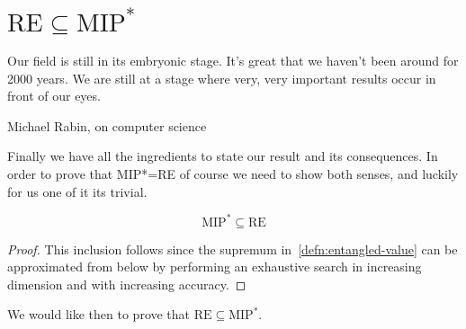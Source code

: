 \section{$\text{RE} \subseteq \text{MIP}^*$}
\epigraph{Our field is still in its embryonic stage. It's great that we haven't been around
for 2000 years. We are still at a stage where very, very important results occur
in front of our eyes.}{Michael Rabin, on computer science}

Finally we have all the ingredients to state our result and its consequences.
In order to prove that MIP*=RE of course we need to show both senses, and luckily for us one of it its trivial.

\begin{theorem}
    \begin{equation}
    \text{MIP}^{*} \subseteq \text{RE} 
    \end{equation}
\end{theorem}
\begin{proof}
    This inclusion follows since the supremum in~\ref{defn:entangled-value} can be approximated from below by performing an exhaustive search in increasing dimension and with increasing accuracy.
\end{proof}
We would like then to prove that $\text{RE} \subseteq \text{MIP}^{*}$.
 